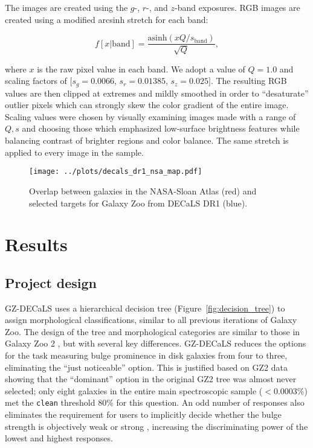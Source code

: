 \documentclass[iop,apj,tighten]{emulateapj}
\begin{document}

The  images are created using the $g$-, $r$-, and $z$-band exposures. RGB images are created using a modified arcsinh stretch \citep{lup04} for each band:

\begin{equation}
f[x|\text{band}]=\frac{\text{asinh}(x Q/s_\text{band})}{\sqrt{Q}},
\end{equation}

\noindent where $x$ is the raw pixel value in each band. We adopt a value of $Q=1.0$ and scaling factors of $[s_g = 0.0066$, $s_r = 0.01385$, $s_z = 0.025]$. The resulting RGB values are then clipped at extremes and mildly smoothed in order to ``desaturate'' outlier pixels which can strongly skew the color gradient of the entire image. Scaling values were chosen by visually examining images made with a range of $Q,s$ and choosing those which emphasized low-surface brightness features while balancing contrast of brighter regions and color balance. The same stretch is applied to every image in the sample. 

\begin{figure*}
\centering
\texttt{[image: ../plots/decals\_dr1\_nsa\_map.pdf]}
\caption{Overlap between galaxies in the NASA-Sloan Atlas (red) and selected targets for Galaxy Zoo from DECaLS DR1 (blue).\label{fig:dr1_map}}
\end{figure*}

\section{Results}

\subsection{Project design}\label{project}

GZ-DECaLS uses a hierarchical decision tree (Figure~\ref{fig:decision_tree}) to assign morphological classifications, similar to all previous iterations of Galaxy Zoo. The design of the tree and morphological categories are similar to those in Galaxy Zoo 2 \citep{wil13}, but with several key differences. GZ-DECaLS reduces the options for the task measuring bulge prominence in disk galaxies from four to three, eliminating the ``just noticeable'' option. This is justified based on GZ2 data showing that the ``dominant'' option in the original GZ2 tree was almost never selected; only eight galaxies in the entire main spectroscopic sample ($<0.0003\%$) met the \texttt{clean} threshold 80\% for this question. An odd number of responses also eliminates the requirement for users to implicitly decide whether the bulge strength is objectively weak or strong \citep{cla95}, increasing the discriminating power of the lowest and highest responses.
\end{document}
